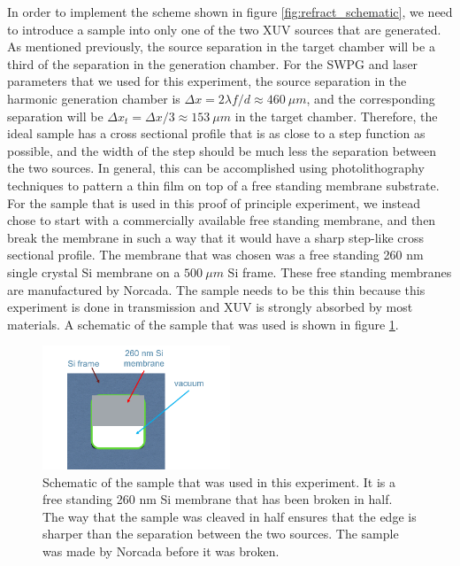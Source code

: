 In order to implement the scheme shown in figure \ref{fig:refract_schematic}, we need to introduce a sample into only one of the two XUV sources that are generated.  As mentioned previously, the source separation in the target chamber will be a third of the separation in the generation chamber. For the SWPG and laser parameters that we used for this experiment, the source separation in the harmonic generation chamber is $\Delta x=2\lambda f/d\approx460\:\mu m$, and the corresponding separation will be $\Delta x_t = \Delta x/3\approx153\: \mu m$ in the target chamber.  Therefore, the ideal sample has a cross sectional profile that is as close to a step function as possible, and the width of the step should be much less the separation between the two sources.  In general, this can be accomplished using photolithography techniques to pattern a thin film on top of a free standing membrane substrate.  For the sample that is used in this proof of principle experiment, we instead chose to start with a commercially available free standing membrane, and then break the membrane in such a way that it would have a sharp step-like cross sectional profile.  The membrane that was chosen was a free standing 260 nm single crystal Si membrane on a $500\:\mu m$ Si frame.  These free standing membranes are manufactured by Norcada.  The sample needs to be this thin because this experiment is done in transmission and XUV is strongly absorbed by most materials. A schematic of the sample that was used is shown in figure \ref{fig:split_sample}.
\begin{figure}
	\centering
	\includegraphics[width=0.5\textwidth]{figures/refractive_index/broken_sample.png}
	\caption[Schematic of the sample used to measure the refractive index of a free standing membrane of silicon]{Schematic of the sample that was used in this experiment.  It is a free standing 260 nm Si membrane that has been broken in half.  The way that the sample was cleaved in half ensures that the edge is sharper than the separation between the two sources.  The sample was made by Norcada before it was broken.}
	\label{fig:split_sample}
\end{figure}

